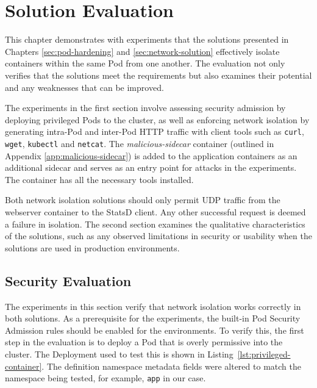 \documentclass[english, 12pt, a4paper, sci, utf8, a-2b, online]{aaltothesis}
\begin{document}
\clearpage

\section{Solution Evaluation} \label{sec:solution}

This chapter demonstrates with experiments that the solutions presented in Chapters \ref{sec:pod-hardening} and \ref{sec:network-solution} effectively isolate containers within the same Pod from one another.
The evaluation not only verifies that the solutions meet the requirements but also examines their potential and any weaknesses that can be improved.

The experiments in the first section involve assessing security admission by deploying privileged Pods to the cluster, as well as enforcing network isolation by generating intra-Pod and inter-Pod HTTP traffic with client tools such as \lstinline{curl}, \lstinline{wget}, \lstinline{kubectl} and \lstinline{netcat}.
The \emph{malicious-sidecar} container (outlined in Appendix \ref{app:malicious-sidecar}) is added to the application containers as an additional sidecar and serves as an entry point for attacks in the experiments.
The container has all the necessary tools installed.



Both network isolation solutions should only permit UDP traffic from the webserver container to the StatsD client.
Any other successful request is deemed a failure in isolation.
The second section examines the qualitative characteristics of the solutions, such as any observed limitations in security or usability when the solutions are used in production environments.

\subsection{Security Evaluation}

The experiments in this section verify that network isolation works correctly in both solutions.
As a prerequisite for the experiments, the built-in Pod Security Admission rules should be enabled for the environments.
To verify this, the first step in the evaluation is to deploy a Pod that is overly permissive into the cluster.
The Deployment used to test this is shown in Listing~\ref{lst:privileged-container}.
The definition namespace metadata fields were altered to match the namespace being tested, for example, \lstinline{app} in our case.
\end{document}
